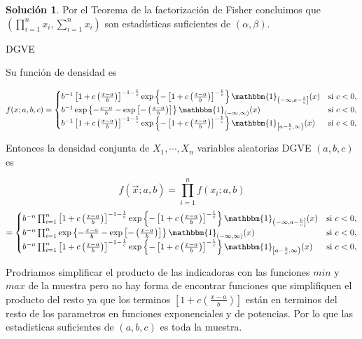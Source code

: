 \documentclass[letterpaper]{article}
\theoremstyle{definition}
\theoremstyle{lemathm}
\theoremstyle{lemathm}
\newtheorem{sol}{Solución}
\theoremstyle{lemathm}
\theoremstyle{lemademthm}
\newcommand{\pars}[1]{\left( #1 \right) }
\newcommand{\bracs}[1]{\left[ #1 \right] }
\newcommand{\set}[1]{\left \{ #1 \right\} }
\newcommand{\1}{\mathbbm{1}}
\begin{document}
\begin{enumerate}
\begin{sol}
			Por el Teorema de la factorización de Fisher concluimos que $(\prod_{i=1}^n x_i, \sum_{i=1}^n x_i)$ son estadísticas suficientes de $\pars{\alpha,\beta}$.

			\item DGVE
			
			Su función de densidad es 

			\[f(x; a,b,c) = \begin{cases}
				b^{-1}\bracs{1+c\pars{\frac{x-a}{b}}}^{-1-\frac{1}{c}}\exp\set{-\bracs{1+c\pars{\frac{x-a}{b}}}^{-\frac{1}{c}}}\1_{\left(-\infty,a-\frac{b}{c}\right]}(x) & \text{si } c < 0,\\
				b^{-1}\exp\set{-\frac{x-a}{b}-\exp\bracs{-\pars{\frac{x-a}{b}}}}\1_{\pars{-\infty,\infty}}(x) & \text{si } c < 0,\\
				b^{-1}\bracs{1+c\pars{\frac{x-a}{b}}}^{-1-\frac{1}{c}}\exp\set{-\bracs{1+c\pars{\frac{x-a}{b}}}^{-\frac{1}{c}}}\1_{\left[a-\frac{b}{c},\infty\right)}(x) & \text{si } c < 0,
			\end{cases}\]

			Entonces la densidad conjunta de $X_1,\cdots,X_n$ variables aleatorias DGVE $(a,b,c)$ es

			\[f(\vec{x}; a,b) = \prod_{i=1}^n f(x_i;a,b)\]\[= \begin{cases}
				b^{-n}\prod_{i=1}^n\bracs{1+c\pars{\frac{x-a}{b}}}^{-1-\frac{1}{c}}\exp\set{-\bracs{1+c\pars{\frac{x-a}{b}}}^{-\frac{1}{c}}}\1_{\left(-\infty,a-\frac{b}{c}\right]}(x) & \text{si } c < 0,\\
				b^{-n}\prod_{i=1}^n\exp\set{-\frac{x-a}{b}-\exp\bracs{-\pars{\frac{x-a}{b}}}}\1_{\pars{-\infty,\infty}}(x) & \text{si } c < 0,\\
				b^{-n}\prod_{i=1}^n\bracs{1+c\pars{\frac{x-a}{b}}}^{-1-\frac{1}{c}}\exp\set{-\bracs{1+c\pars{\frac{x-a}{b}}}^{-\frac{1}{c}}}\1_{\left[a-\frac{b}{c},\infty\right)}(x) & \text{si } c < 0,
			\end{cases}\]

			Prodriamos simplificar el producto de las indicadoras con las funciones $min$ y $max$ de la muestra pero no hay forma de encontrar funciones que simplifiquen el producto del resto ya que los terminos $\bracs{1+c\pars{\frac{x-a}{b}}}$ están en terminos del resto de los parametros en funciones exponenciales y de potencias. Por lo que las estadisticas suficientes de $(a,b,c)$ es toda la muestra.
		\end{sol}
    \end{enumerate}

	
\end{document}
